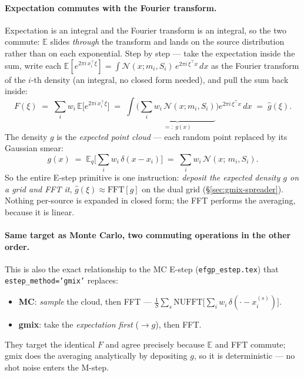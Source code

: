 \documentclass[11pt]{article}
\newcommand{\E}{\mathbb{E}}
\newcommand{\Eq}[1][q]{\mathbb{E}_{#1}}
\newcommand{\code}[1]{\texttt{\small #1}}
\begin{document}
\paragraph{Expectation commutes with the Fourier transform.}
Expectation is an integral and the Fourier transform is an integral, so
the two commute: $\E$ slides \emph{through} the transform and lands on
the source distribution rather than on each exponential.  Step by step
--- take the expectation inside the sum, write each
$\E[e^{2\pi i\,x_i^\top\xi}]=\int \mathcal{N}(x;m_i,S_i)\,e^{2\pi
i\,\xi^\top x}\,dx$ as the Fourier transform of the $i$-th density (an
integral, no closed form needed), and pull the sum back inside:
\begin{equation}
\boxed{\;
F(\xi)
\;=\;\sum_i w_i\,\E\big[e^{2\pi i\,x_i^\top\xi}\big]
\;=\;\int\!\Big(\underbrace{\textstyle\sum_i w_i\,\mathcal{N}(x;m_i,S_i)}
       _{=:\;g(x)}\Big) e^{2\pi i\,\xi^\top x}\,dx
\;=\;\widehat g(\xi).
\;}
\label{eq:commute}
\end{equation}
The density $g$ is the \emph{expected point cloud} --- each random point
replaced by its Gaussian smear:
\begin{equation}
g(x)\;=\;\Eq\Big[\sum_i w_i\,\delta(x-x_i)\Big]
\;=\;\sum_i w_i\,\mathcal{N}(x;\,m_i, S_i).
\label{eq:gmix-density}
\end{equation}
So the entire E-step primitive is one instruction: \emph{deposit the
expected density $g$ on a grid and FFT it}, $\widehat g(\xi)\approx
\mathrm{FFT}[g]$ on the dual grid (\S\ref{sec:gmix-spreader}).  Nothing
per-source is expanded in closed form; the FFT performs the averaging,
because it is linear.

\paragraph{Same target as Monte Carlo, two commuting operations in the
other order.}  This is also the exact relationship to the MC E-step
(\texttt{efgp\_estep.tex}) that \code{estep\_method='gmix'} replaces:
\begin{itemize}
\item \textbf{MC}: \emph{sample} the cloud, then FFT ---
$\tfrac1S\sum_s\mathrm{NUFFT}\big[\sum_i w_i\,\delta(\cdot-x_i^{(s)})\big]$.
\item \textbf{gmix}: take the \emph{expectation first} ($\to g$), then FFT.
\end{itemize}
They target the identical $F$ and agree precisely because $\E$ and FFT
commute; gmix does the averaging analytically by depositing $g$, so it
is deterministic --- no shot noise enters the M-step.
\end{document}
